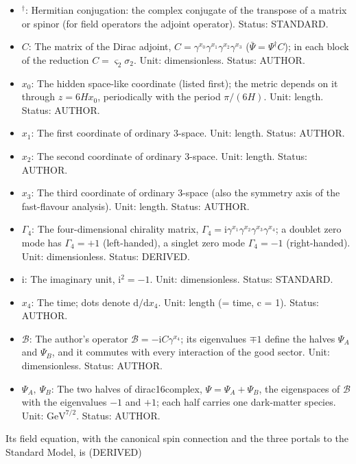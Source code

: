 \documentclass[
  10pt,
]{article}
\begin{document}
\begin{itemize}
  \(\mathrm{GeV}^{7/2}\). Status: RECORD.
\item
  \({}^\dagger\): Hermitian conjugation: the complex conjugate of the
  transpose of a matrix or spinor (for field operators the adjoint
  operator). Status: STANDARD.
\item
  \(C\): The matrix of the Dirac adjoint,
  \(C = \gamma^{x_0}\gamma^{x_1}\gamma^{x_2}\gamma^{x_3}\)
  (\(\bar\Psi = \Psi^\dagger C\)); in each block of the reduction
  \(C = \varsigma_2\sigma_2\). Unit: dimensionless. Status: AUTHOR.
\item
  \(x_0\): The hidden space-like coordinate (listed first); the metric
  depends on it through \(z = 6Hx_0\), periodically with the period
  \(\pi/(6H)\). Unit: length. Status: AUTHOR.
\item
  \(x_1\): The first coordinate of ordinary 3-space. Unit: length.
  Status: AUTHOR.
\item
  \(x_2\): The second coordinate of ordinary 3-space. Unit: length.
  Status: AUTHOR.
\item
  \(x_3\): The third coordinate of ordinary 3-space (also the symmetry
  axis of the fast-flavour analysis). Unit: length. Status: AUTHOR.
\item
  \(\Gamma_4\): The four-dimensional chirality matrix,
  \(\Gamma_4 = \mathrm{i}\gamma^{x_1}\gamma^{x_2}\gamma^{x_3}\gamma^{x_4}\);
  a doublet zero mode has \(\Gamma_4 = +1\) (left-handed), a singlet
  zero mode \(\Gamma_4 = -1\) (right-handed). Unit: dimensionless.
  Status: DERIVED.
\item
  \(\mathrm{i}\): The imaginary unit, \(\mathrm{i}^2 = -1\). Unit:
  dimensionless. Status: STANDARD.
\item
  \(x_4\): The time; dots denote \(\mathrm{d}/\mathrm{d}x_4\). Unit:
  length (= time, c = 1). Status: AUTHOR.
\item
  \(\mathcal{B}\): The author's operator
  \(\mathcal{B} = -\mathrm{i}C\gamma^{x_4}\); its eigenvalues \(\mp1\)
  define the halves \(\Psi_A\) and \(\Psi_B\), and it commutes with
  every interaction of the good sector. Unit: dimensionless. Status:
  AUTHOR.
\item
  \(\Psi_A,\ \Psi_B\): The two halves of dirac16complex,
  \(\Psi = \Psi_A + \Psi_B\), the eigenspaces of \(\mathcal{B}\) with
  the eigenvalues \(-1\) and \(+1\); each half carries one dark-matter
  species. Unit: \(\mathrm{GeV}^{7/2}\). Status: AUTHOR.
\end{itemize}

Its field equation, with the canonical spin connection and the three
portals to the Standard Model, is (DERIVED)
\end{document}
